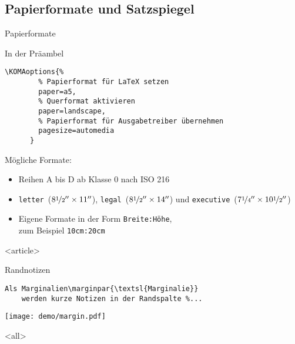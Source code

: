 \subsection{Papierformate und Satzspiegel}

\begin{Frame}[fragile]{Papierformate}
  \begin{Block}{In der Präambel}
    \begin{lstlisting}[gobble=6,style=block]
      \KOMAoptions{%
        % Papierformat für LaTeX setzen
        paper=a5,
        % Querformat aktivieren
        paper=landscape,
        % Papierformat für Ausgabetreiber übernehmen
        pagesize=automedia
      }
    \end{lstlisting}
  \end{Block}

  \xxx

  Mögliche Formate:
  \begin{itemize}
    \item Reihen A bis D ab Klasse 0 nach ISO 216
    \item \lstinline[language={}]-letter-~($8\nicefrac12'' \times 11''$),
      \lstinline-legal-~($8\nicefrac12'' \times 14''$) und
      \lstinline-executive-~($7\nicefrac14'' \times 10\nicefrac12''$)
    \item Eigene Formate in der Form \lstinline-Breite:Höhe-,\\
      zum Beispiel \lstinline-10cm:20cm-
  \end{itemize}
\end{Frame}

\mode
<article>

\begin{Block}{Randnotizen}
  \begin{lstlisting}[gobble=4]
    Als Marginalien\marginpar{\textsl{Marginalie}}
    werden kurze Notizen in der Randspalte %...
  \end{lstlisting}

  \begin{center}
    \texttt{[image: demo/margin.pdf]}
  \end{center}
\end{Block}

\mode
<all>

